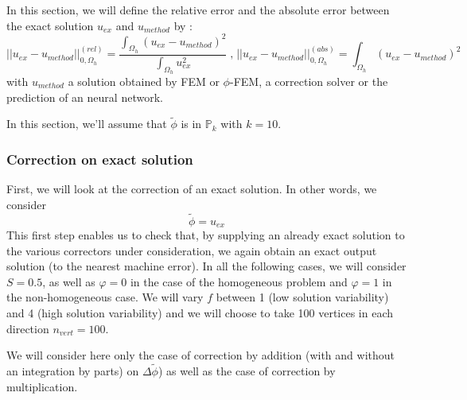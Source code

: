 In this section, we will define the relative error and the absolute error between the exact solution $u_{ex}$ and $u_{method}$ by :
\begin{equation*}
	||u_{ex}-u_{method}||_{0,\Omega_h}^{(rel)}=\frac{\int_{\Omega_h} (u_{ex}-u_{method})^2}{\int_{\Omega_h} u_{ex}^2} \; \text{,} \; ||u_{ex}-u_{method}||_{0,\Omega_h}^{(abs)}=\int_{\Omega_h} (u_{ex}-u_{method})^2
\end{equation*}
with $u_{method}$ a solution obtained by FEM or $\phi$-FEM, a correction solver or the prediction of an neural network.

In this section, we'll assume that $\tilde{\phi}$ is in $\mathbb{P}_k$ with $k=10$.

\subsubsection{Correction on exact solution} \label{Corr.results.ana}

First, we will look at the correction of an exact solution. In other words, we consider
\begin{equation*}
	\tilde{\phi}=u_{ex}
\end{equation*}
This first step enables us to check that, by supplying an already exact solution to the various correctors under consideration, we again obtain an exact output solution (to the nearest machine error). In all the following cases, we will consider $S=0.5$, as well as $\varphi=0$ in the case of the homogeneous problem and $\varphi=1$ in the non-homogeneous case. We will vary $f$ between 1 (low solution variability) and 4 (high solution variability) and we will choose to take 100 vertices in each direction $n_{vert}=100$.

\begin{Rem}
	We will consider here only the case of correction by addition (with and without an integration by parts) on $\Delta\tilde{\phi}$) as well as the case of correction by multiplication.
\end{Rem}

\newpage

